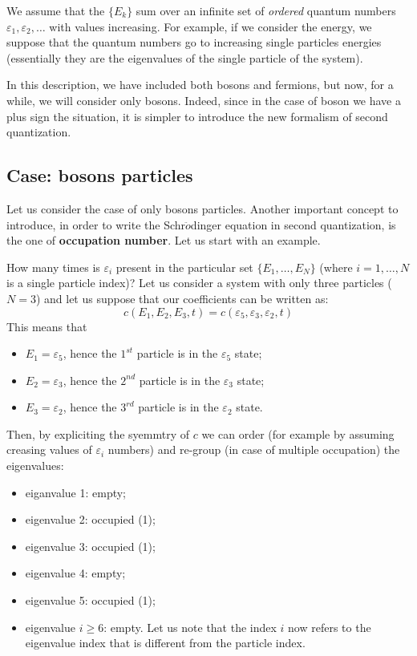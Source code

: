 \documentclass[../main/main.tex]{subfiles}
\begin{document}
We assume that the \( \{ E_k \}   \) sum over an infinite set of \emph{ordered} quantum numbers \( \varepsilon _1, \varepsilon _2, \dots \) with values increasing. For example, if we consider the energy, we suppose that the quantum numbers go to increasing single particles energies (essentially they are the eigenvalues of the single particle of the system).

In this description, we have included both bosons and fermions, but now, for a while, we will consider only bosons. Indeed, since in the case of boson we have a plus sign the situation, it is simpler to introduce the new formalism of second quantization.

\subsection{Case: bosons particles}

Let us consider the case of only bosons particles.
Another important concept to introduce, in order to write the Schr$\ddot{o}$dinger equation in second quantization, is the one of \textbf{occupation number}. Let us start with an example. 

\begin{example}{}{}
How many times is \( \varepsilon _i \)  present in the particular set \( \{ E_1,\dots,E_N \}   \) (where \( i=1,\dots,N \) is a single particle index)?
Let us consider a system with only three particles (\( N=3 \)) and let us suppose that our coefficients can be written as:
\begin{equation*}
  c (E_1,E_2,E_3,t) = c (\varepsilon _5,\varepsilon _3,\varepsilon _2,t)
\end{equation*}
This means that
\begin{itemize}
\item \( E_1 = \varepsilon _5 \), hence the \( 1^{st} \) particle is in the \( \varepsilon _5  \) state;
\item \( E_2 = \varepsilon _3 \), hence the \( 2^{nd} \) particle is in the \( \varepsilon _3  \) state;
\item \( E_3 = \varepsilon _2 \), hence the \( 3^{rd} \) particle is in the \( \varepsilon _2  \) state.
\end{itemize}
Then, by expliciting the syemmtry of \( c \) we can order (for example by assuming creasing values of \( \varepsilon _i \) numbers) and re-group (in case of multiple occupation) the eigenvalues:
\begin{itemize}
\item eiganvalue 1: empty;
\item eigenvalue 2: occupied (1);
\item eigenvalue 3: occupied (1);
\item eigenvalue 4: empty;
\item eigenvalue 5: occupied (1);
\item eigenvalue \( i \ge 6\): empty. Let us note that the index \( i \) now refers to the eigenvalue index that is different from the particle index.
\end{itemize}
\end{example}
\end{document}
